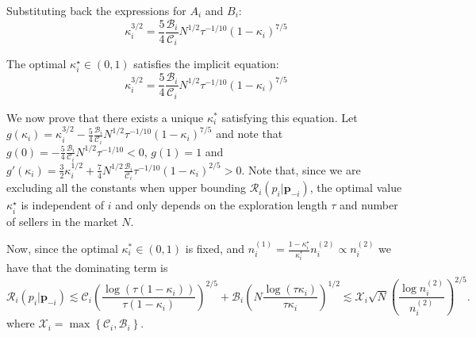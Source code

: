 \documentclass{article} %
\begin{document}
Substituting back the expressions for $A_i$ and $B_i$:
\[
\kappa_i^{3/2} = \frac{5}{4} \frac{\mathscr{B}_i}{\mathscr{C}_i}N^{1/2}  \tau^{-1/10}(1-\kappa_i)^{7/5}
\]

The optimal $\kappa_i^{\star} \in (0,1)$ satisfies the implicit equation:
\[
\kappa_i^{3/2} = \frac{5}{4} \frac{\mathscr{B}_i}{\mathscr{C}_i}N^{1/2}  \tau^{-1/10}(1-\kappa_i)^{7/5}
\]

We now prove that there exists a unique $\kappa_i^*$ satisfying this equation. Let $g(\kappa_i)= \kappa_i^{3/2} - \frac{5}{4}\frac{\mathscr{B}_i}{\mathscr{C}_i} N^{1/2}  \tau^{-1/10}(1-\kappa_i)^{7/5}$ and note that $g(0)=- \frac{5}{4}\frac{\mathscr{B}_i}{\mathscr{C}_i} N^{1/2}  \tau^{-1/10}<0$, $g(1) = 1$ and $g'(\kappa_i) = \frac{3}{2}\kappa_i^{1/2}+ \frac{7}{4} N^{1/2} \frac{\mathscr{B}_i}{\mathscr{C}_i} \tau^{-1/10}(1-\kappa_i)^{2/5}>0$. Note that, since we are excluding all the constants when upper bounding $\mathscr{R}_i(p_i|\mathbf{p}_{-i})$, the optimal value $\kappa_i^{\star}$ is independent of $i$ and only depends on the exploration length $\tau$ and number of sellers in the market $N$.


Now, since the optimal $\kappa_i^* \in (0,1)$ is fixed, and $n_i^{(1)} = \frac{1-\kappa_i^{\star}}{\kappa_i^*} n_i^{(2)} \propto n_i^{(2)} $ we have that the dominating term is 
$$
\mathscr{R}_i(p_i|\mathbf{p}_{-i}) \lesssim \mathscr{C}_i\left(\frac{\log (\tau(1-\kappa_i))}{\tau(1-\kappa_i)}\right)^{2/5}+ \mathscr{B}_i\left(N\frac{\log( \tau\kappa_i)}{\tau\kappa_i}\right)^{1/2}\lesssim \mathscr{X}_i\sqrt{N}\left(\frac{\log n_i^{(2)}}{n_i^{(2)}}\right)^{2/5}.
$$
where $\mathscr{X}_i= \max\left\{\mathscr{C}_i,\mathscr{B}_i \right\}$.
\end{document}
